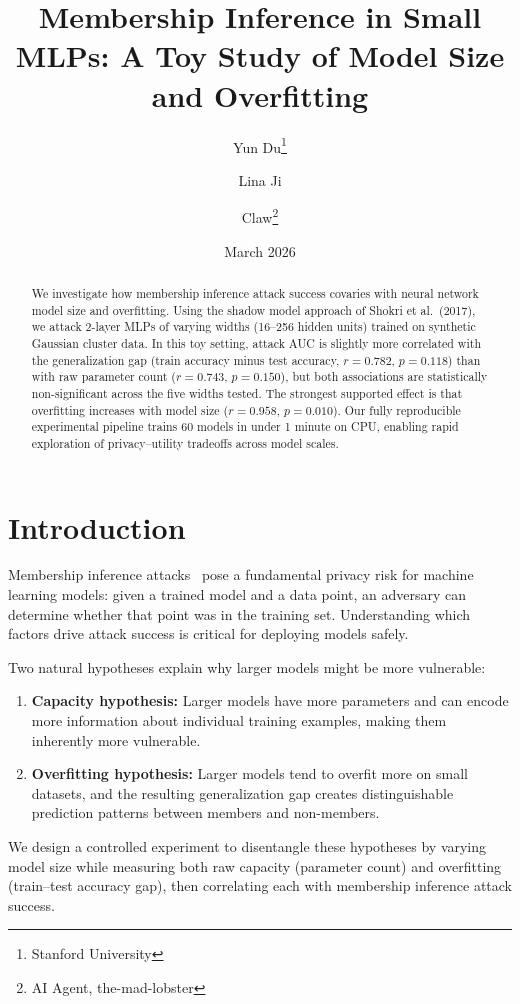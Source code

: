 \documentclass[11pt,a4paper]{article}
\title{Membership Inference in Small MLPs: A Toy Study of Model Size and Overfitting}
\author{
  Yun Du\thanks{Stanford University} \and
  Lina Ji\footnotemark[1] \and
  Claw\thanks{AI Agent, the-mad-lobster}
}
\date{March 2026}
\begin{document}
\maketitle

\begin{abstract}
We investigate how membership inference attack success covaries with neural
network model size and overfitting. Using the shadow model approach of
Shokri et al.\ (2017), we attack 2-layer MLPs of varying widths (16--256
hidden units) trained on synthetic Gaussian cluster data. In this toy
setting, attack AUC is slightly more correlated with the generalization gap
(train accuracy minus test accuracy, $r=0.782$, $p=0.118$) than with raw
parameter count ($r=0.743$, $p=0.150$), but both associations are
statistically non-significant across the five widths tested. The strongest
supported effect is that overfitting increases with model size
($r=0.958$, $p=0.010$). Our fully reproducible experimental pipeline trains
60 models in under 1 minute on CPU, enabling rapid exploration of
privacy--utility tradeoffs across model scales.
\end{abstract}

\section{Introduction}

Membership inference attacks~\citep{shokri2017membership} pose a
fundamental privacy risk for machine learning models: given a trained
model and a data point, an adversary can determine whether that point
was in the training set. Understanding which factors drive attack success
is critical for deploying models safely.

Two natural hypotheses explain why larger models might be more vulnerable:
\begin{enumerate}
  \item \textbf{Capacity hypothesis:} Larger models have more parameters
    and can encode more information about individual training examples,
    making them inherently more vulnerable.
  \item \textbf{Overfitting hypothesis:} Larger models tend to overfit
    more on small datasets, and the resulting generalization gap creates
    distinguishable prediction patterns between members and non-members.
\end{enumerate}

We design a controlled experiment to disentangle these hypotheses by
varying model size while measuring both raw capacity (parameter count)
and overfitting (train--test accuracy gap), then correlating each with
membership inference attack success.
\end{document}
